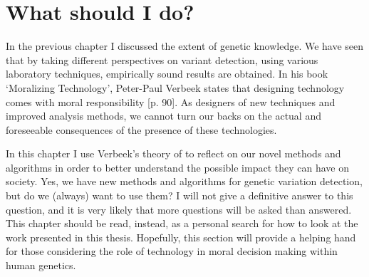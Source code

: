 \chapter[What should I do?]{What should I do? }
\label{chap:ethics}

{ \Large {} }


\newpage

\noindent In the previous chapter I discussed the extent of genetic knowledge. 
We have seen that by taking different perspectives on variant detection, using various laboratory techniques, empirically sound results are obtained. 
In his book ‘Moralizing Technology’, Peter-Paul Verbeek states that designing technology comes with moral responsibility \cite{Verbeek_2011}[p. 90]. 
As designers of new techniques and improved analysis methods, we cannot turn our backs on the actual and foreseeable consequences of the presence of these technologies. 

In this chapter I use Verbeek’s theory of to reflect on our novel methods and algorithms in order to better understand the possible impact they can have on society. 
Yes, we have new methods and algorithms for genetic variation detection, but do we (always) want to use them? I will not give a definitive answer to this question, and it is very likely that more questions will be asked than answered. 
This chapter should be read, instead, as a personal search for how to look at the work presented in this thesis. 
Hopefully, this section will provide a helping hand for those considering the role of technology in moral decision making within human genetics. 



